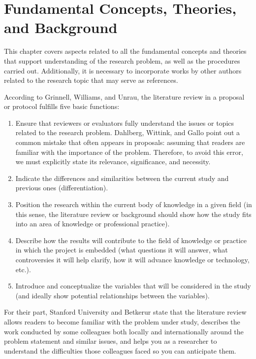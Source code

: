 \section{Fundamental Concepts, Theories, and Background}

This chapter covers aspects related to all the fundamental concepts and theories that support understanding of the research problem, as well as the procedures carried out. Additionally, it is necessary to incorporate works by other authors related to the research topic that may serve as references.

According to Grinnell, Williams, and Unrau\cite{grinnell2009}, the literature review in a proposal or protocol fulfills five basic functions:

\begin{enumerate}[label=\alph*)]
	
	\item Ensure that reviewers or evaluators fully understand the issues or topics related to the research problem. Dahlberg, Wittink, and Gallo\cite{dahlberg2010} point out a common mistake that often appears in proposals: assuming that readers are familiar with the importance of the problem. Therefore, to avoid this error, we must explicitly state its relevance, significance, and necessity.

	\item Indicate the differences and similarities between the current study and previous ones (differentiation).

	\item Position the research within the current body of knowledge in a given field (in this sense, the literature review or background should show how the study fits into an area of knowledge or professional practice).

	\item Describe how the results will contribute to the field of knowledge or practice in which the project is embedded (what questions it will answer, what controversies it will help clarify, how it will advance knowledge or technology, etc.).

	\item Introduce and conceptualize the variables that will be considered in the study (and ideally show potential relationships between the variables).

\end{enumerate}

For their part, Stanford University\cite{stanford2017} and Betkerur\cite{betkerur2008} state that the literature review allows readers to become familiar with the problem under study, describes the work conducted by some colleagues both locally and internationally around the problem statement and similar issues, and helps you as a researcher to understand the difficulties those colleagues faced so you can anticipate them.

